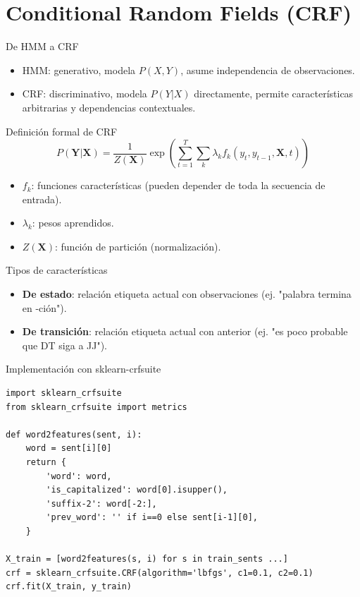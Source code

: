 \documentclass[aspectratio=169, 10pt, xcolor=table]{beamer}
\begin{document}
\section{Conditional Random Fields (CRF)}

\begin{frame}{De HMM a CRF}
    \begin{itemize}
        \item HMM: generativo, modela $P(X,Y)$, asume independencia de observaciones.
        \item CRF: discriminativo, modela $P(Y|X)$ directamente, permite características arbitrarias y dependencias contextuales.
    \end{itemize}
\end{frame}

\begin{frame}{Definición formal de CRF}
    \[
    P(\mathbf{Y}|\mathbf{X}) = \frac{1}{Z(\mathbf{X})} \exp\left( \sum_{t=1}^{T} \sum_{k} \lambda_k f_k(y_t, y_{t-1}, \mathbf{X}, t) \right)
    \]
    \begin{itemize}
        \item $f_k$: funciones características (pueden depender de toda la secuencia de entrada).
        \item $\lambda_k$: pesos aprendidos.
        \item $Z(\mathbf{X})$: función de partición (normalización).
    \end{itemize}
\end{frame}

\begin{frame}{Tipos de características}
    \begin{itemize}
        \item \textbf{De estado}: relación etiqueta actual con observaciones (ej. "palabra termina en -ción").
        \item \textbf{De transición}: relación etiqueta actual con anterior (ej. "es poco probable que DT siga a JJ").
    \end{itemize}
\end{frame}

\begin{frame}[fragile]{Implementación con sklearn-crfsuite}
    \begin{lstlisting}
import sklearn_crfsuite
from sklearn_crfsuite import metrics

def word2features(sent, i):
    word = sent[i][0]
    return {
        'word': word,
        'is_capitalized': word[0].isupper(),
        'suffix-2': word[-2:],
        'prev_word': '' if i==0 else sent[i-1][0],
    }

X_train = [word2features(s, i) for s in train_sents ...]
crf = sklearn_crfsuite.CRF(algorithm='lbfgs', c1=0.1, c2=0.1)
crf.fit(X_train, y_train)
    \end{lstlisting}
\end{frame}
\end{document}
